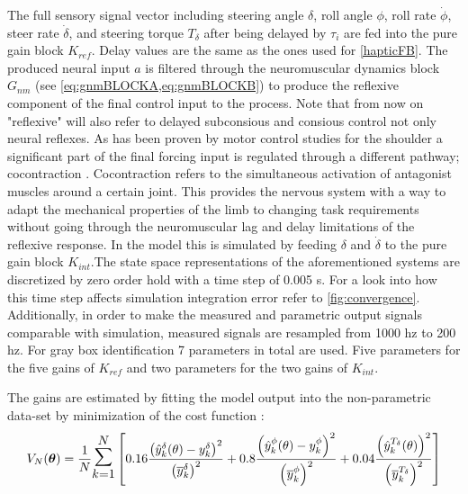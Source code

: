 The full sensory signal vector including steering angle \ensuremath{\delta}, roll angle \ensuremath{\phi}, roll rate \ensuremath{\dot{\phi}}, steer rate \ensuremath{\dot{\delta}}, and steering torque \ensuremath{T_\delta} after being delayed by \ensuremath{\tau_i} are fed into the pure gain block \ensuremath{K_{ref}}. Delay values are the same as the ones used for \cref{hapticFB}. The produced neural input \ensuremath{a} is filtered through the neuromuscular dynamics block \ensuremath{G_{nm}} (see \cref{eq:gnmBLOCKA,eq:gnmBLOCKB}) to produce the reflexive component of the final control input to the process. Note that from now on "reflexive" will also refer to delayed subconsious and consious control not only neural reflexes. As has been proven by motor control studies for the shoulder a significant part of the final forcing input is regulated through a different pathway; cocontraction \cite{schouten2008nmclab} . Cocontraction refers to the  simultaneous activation of antagonist muscles around a certain joint. This  provides the nervous system with a way to adapt the mechanical properties of the limb to changing task requirements without going through the neuromuscular lag and delay limitations of the reflexive response. In the model this is simulated by feeding \ensuremath{\delta} and \ensuremath{\dot{\delta}} to the pure gain block \ensuremath{K_{int}}.The state space representations of the aforementioned systems are discretized by zero order hold with a time step of 0.005 \si{\second}. For a look into how this time step affects simulation integration error refer to \cref{fig:convergence}. Additionally, in order to make the measured  and parametric output signals comparable with simulation, measured signals are resampled from 1000 \si{hz} to 200 \si{hz}.  For gray box identification 7 parameters in total are used. Five parameters for the five gains of \ensuremath{K_{ref}} and two parameters for the two gains of \ensuremath{K_{int}}.
 
 
 
 
The gains are estimated by fitting the model output into the non-parametric data-set by minimization of the cost function :
\begin{equation}
    V_{N}(\boldsymbol{\theta})=\frac{1}{N} \mathlarger{\mathlarger{\mathlarger{\sum}}}_{k=1}^{N}\left[0.16\frac{\left(\hat{y}^{\delta}_k(\mathbf{\theta})-y^\delta_k\right)^{2}}{\left(\overline{y}^{\delta}_k\right)^2}+0.8\frac{\left(\hat{y}^{\phi}_k(\mathbf{\theta})-y^\phi_k\right)^{2}}{\left(\overline{y}^{\phi}_k\right)^2}+0.04\frac{\left(\hat{y}^{T_\delta}_k(\mathbf{\theta})\right)^2}{\left(\overline{y}^{T_\delta}_k\right)^2}\right]
    \label{eq:cost2}
    \end{equation}
 
